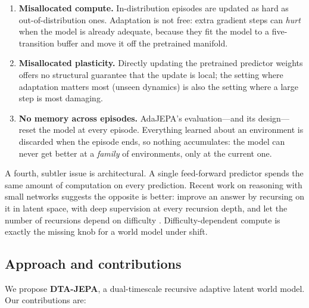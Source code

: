 \begin{enumerate}[leftmargin=1.2em,itemsep=2pt]
\item \textbf{Misallocated compute.} In-distribution episodes are updated as hard as
out-of-distribution ones. Adaptation is not free: extra gradient steps can \emph{hurt} when
the model is already adequate, because they fit the model to a five-transition buffer and move
it off the pretrained manifold.
\item \textbf{Misallocated plasticity.} Directly updating the pretrained predictor weights
offers no structural guarantee that the update is local; the setting where adaptation matters
most (unseen dynamics) is also the setting where a large step is most damaging.
\item \textbf{No memory across episodes.} AdaJEPA's evaluation---and its design---reset the
model at every episode. Everything learned about an environment is discarded when the episode
ends, so nothing accumulates: the model can never get better at a \emph{family} of
environments, only at the current one.
\end{enumerate}

A fourth, subtler issue is architectural. A single feed-forward predictor spends the same
amount of computation on every prediction. Recent work on reasoning with small networks
suggests the opposite is better: improve an answer by recursing on it in latent space, with
deep supervision at every recursion depth, and let the number of recursions depend on
difficulty \cite{tiny-recursive-2025,hrm-2025,hrm-text-2026}. Difficulty-dependent compute is
exactly the missing knob for a world model under shift.

\subsection{Approach and contributions}

We propose \textbf{DTA-JEPA}, a dual-timescale recursive adaptive latent world model. Our
contributions are:

